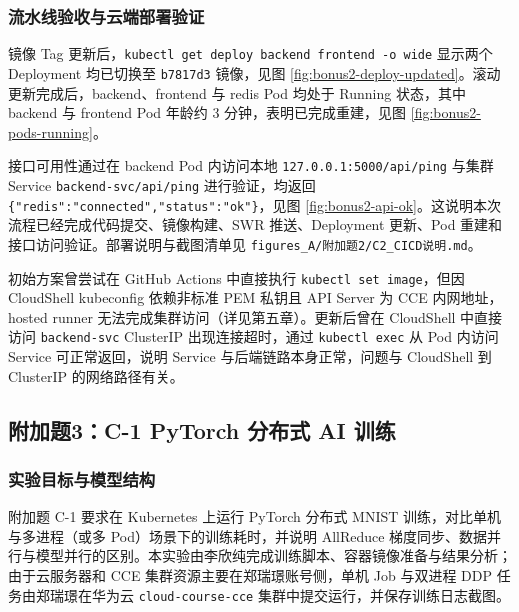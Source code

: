 \subsubsection{流水线验收与云端部署验证}

镜像 Tag 更新后，\verb|kubectl get deploy backend frontend -o wide| 显示两个 Deployment 均已切换至 \verb|b7817d3| 镜像，见图 \ref{fig:bonus2-deploy-updated}。滚动更新完成后，backend、frontend 与 redis Pod 均处于 Running 状态，其中 backend 与 frontend Pod 年龄约 3 分钟，表明已完成重建，见图 \ref{fig:bonus2-pods-running}。



接口可用性通过在 backend Pod 内访问本地 \verb|127.0.0.1:5000/api/ping| 与集群 Service \verb|backend-svc/api/ping| 进行验证，均返回 \verb|{"redis":"connected","status":"ok"}|，见图 \ref{fig:bonus2-api-ok}。这说明本次流程已经完成代码提交、镜像构建、SWR 推送、Deployment 更新、Pod 重建和接口访问验证。部署说明与截图清单见 \verb|figures_A/附加题2/C2_CICD说明.md|。


初始方案曾尝试在 GitHub Actions 中直接执行 \verb|kubectl set image|，但因 CloudShell kubeconfig 依赖非标准 PEM 私钥且 API Server 为 CCE 内网地址，hosted runner 无法完成集群访问（详见第五章）。更新后曾在 CloudShell 中直接访问 \verb|backend-svc| ClusterIP 出现连接超时，通过 \verb|kubectl exec| 从 Pod 内访问 Service 可正常返回，说明 Service 与后端链路本身正常，问题与 CloudShell 到 ClusterIP 的网络路径有关。

\subsection{附加题3：C-1 PyTorch 分布式 AI 训练}

\subsubsection{实验目标与模型结构}

附加题 C-1 要求在 Kubernetes 上运行 PyTorch 分布式 MNIST 训练，对比单机与多进程（或多 Pod）场景下的训练耗时，并说明 AllReduce 梯度同步、数据并行与模型并行的区别。本实验由李欣纯完成训练脚本、容器镜像准备与结果分析；由于云服务器和 CCE 集群资源主要在郑瑞璟账号侧，单机 Job 与双进程 DDP 任务由郑瑞璟在华为云 \verb|cloud-course-cce| 集群中提交运行，并保存训练日志截图。

